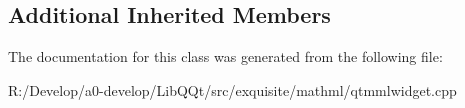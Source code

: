 \subsection*{Additional Inherited Members}


The documentation for this class was generated from the following file\+:\begin{DoxyCompactItemize}
\item 
R\+:/\+Develop/a0-\/develop/\+Lib\+Q\+Qt/src/exquisite/mathml/qtmmlwidget.\+cpp\end{DoxyCompactItemize}
